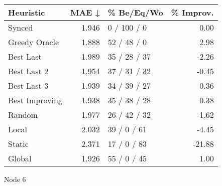 \begin{tabular}{lrlr}
\toprule
\textbf{Heuristic} & \textbf{MAE ↓} & \textbf{\% Be/Eq/Wo} & \textbf{\% Improv.} \\
\midrule
            Synced &          1.946 &          0 / 100 / 0 &                0.00 \\
     Greedy Oracle &          1.888 &          52 / 48 / 0 &                2.98 \\
         Best Last &          1.989 &         35 / 28 / 37 &               -2.26 \\
       Best Last 2 &          1.954 &         37 / 31 / 32 &               -0.45 \\
       Best Last 3 &          1.939 &         34 / 39 / 27 &                0.36 \\
    Best Improving &          1.938 &         35 / 38 / 28 &                0.38 \\
            Random &          1.977 &         26 / 42 / 32 &               -1.62 \\
             Local &          2.032 &          39 / 0 / 61 &               -4.45 \\
            Static &          2.371 &          17 / 0 / 83 &              -21.88 \\
            Global &          1.926 &          55 / 0 / 45 &                1.00 \\
\bottomrule
\end{tabular}
\caption{Node 6}
\label{tab:hr_non_lr05_le2_bs4_6}
